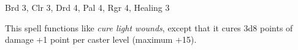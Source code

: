 
\begin{description*}
\item[Level:] Brd 3, Clr 3, Drd 4, Pal 4, Rgr 4, Healing 3
\end{description*}

This spell functions like \textit{cure light wounds}, except that it cures 3d8
points of damage +1 point per caster level (maximum +15).